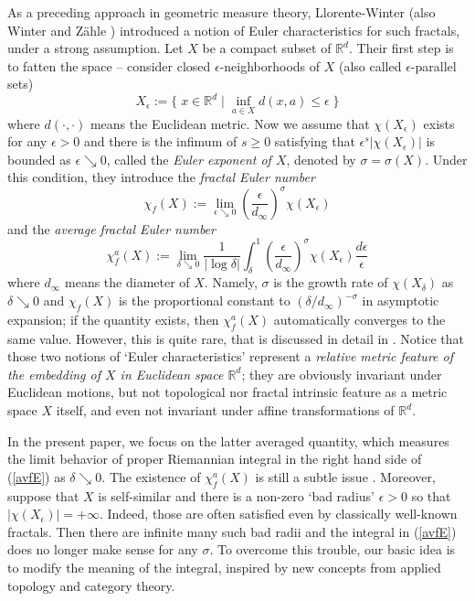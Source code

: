\documentclass[12pt]{amsart}
\numberwithin{equation}{section}
\newcommand{\R}{\mathbb{R}}
\begin{document}
As a preceding approach in geometric measure theory, Llorente-Winter \cite{LW07} (also Winter and Z\"{a}hle \cite{W06, WZ13}) introduced a notion of Euler characteristics for such fractals, under a strong assumption. 
Let $X$ be a compact subset of $\R^d$. 
Their first step is to fatten the space -- consider closed $\epsilon$-neighborhoods of $X$ (also called $\epsilon$-parallel sets) 
$$X_\epsilon:= \{\; x \in \R^d \; | \; \inf_{a \in X} d(x, a) \le \epsilon\; \}$$
where $d(\cdot, \cdot)$ means the Euclidean metric. 
Now we assume that $\chi(X_\epsilon)$ exists for any $\epsilon > 0$ and there is the infimum of $s\ge 0$ satisfying that $\epsilon^s |\chi(X_\epsilon)|$ is bounded as $\epsilon \searrow 0$, called the {\em Euler exponent of $X$}, denoted by $\sigma=\sigma(X)$. 
Under this condition, they introduce the {\em fractal Euler number} 
\begin{equation}\label{fE}
\chi_{f}(X):=\lim_{\epsilon \searrow 0}  \left(\frac{\epsilon}{d_\infty}\right)^\sigma \chi(X_\epsilon)
\end{equation}
and the {\em average fractal Euler number} 
\begin{equation}\label{avfE}
\chi_{f}^{a}(X):=\lim_{\delta \searrow 0} \frac{1}{|\log \delta|} \int_\delta^1 \left(\frac{\epsilon}{d_\infty}\right)^\sigma \chi(X_\epsilon) \frac{d\epsilon}{\epsilon}
\end{equation}
where $d_\infty$ means the diameter of $X$. Namely,  $\sigma$ is the growth rate of $\chi(X_\delta)$ as $\delta \searrow 0$ and 
$\chi_{f}(X)$ is the proportional constant to $(\delta/d_\infty)^{- \sigma}$ in asymptotic expansion; if  the quantity exists, then $\chi_{f}^{a}(X)$ automatically converges to the same value. However, this is quite rare, that is discussed in detail in \cite{LW07}. 
Notice that those two notions of `Euler characteristics' represent a {\em relative metric feature of the embedding of $X$ in Euclidean space $\R^d$}; they are obviously invariant under Euclidean motions, but not topological nor fractal intrinsic feature as a metric space $X$ itself, and even not invariant under affine transformations of $\R^d$. 

In the present paper, we focus on the latter averaged quantity, which measures the limit behavior of proper Riemannian integral in the right hand side of (\ref{avfE}) as $\delta \searrow 0$. The existence of $\chi_{f}^{a}(X)$ is still a subtle issue  \cite{LW07}. 
Moreover, suppose that $X$ is self-similar and there is a non-zero `bad radius' $\epsilon>0$ so that $|\chi(X_\epsilon)|=+\infty$. Indeed, 
those are often satisfied even by classically well-known fractals. Then there are infinite many such bad radii and the integral in (\ref{avfE}) does no longer make sense for any $\sigma$. 
To overcome this trouble, our basic idea is to modify the meaning of the integral, inspired by new concepts from applied topology and category theory.
\end{document}
